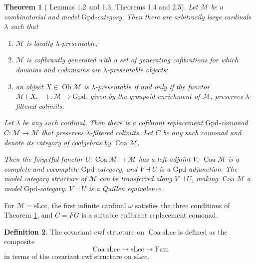 \documentclass[a4paper]{article}
\newtheorem{theorem}{Theorem}
\theoremstyle{remark}
\theoremstyle{definition}
\newtheorem{definition}[theorem]{Definition}
\begin{document}
\begin{theorem}[\citet{coalgebraic-models} Lemmas 1.2 and 1.3, Theorems 1.4 and 2.5]
  \label{th:coalgebraic-model-category}
  Let $\mathcal{M}$ be a combinatorial and model $\mathrm{Gpd}$-category.
  Then there are arbitrarily large cardinals $\lambda$ such that
  \begin{enumerate}[label={(\arabic*)}]
    \item
      $\mathcal{M}$ is locally $\lambda$-presentable;
    \item
      $\mathcal{M}$ is cofibrantly generated with a set of generating cofibrations for which domains and codomains are $\lambda$-presentable objects;
    \item
      an object $X \in \operatorname{Ob} \mathcal{M}$ is $\lambda$-presentable if and only if the functor $\mathcal{M}(X, -) : \mathcal{M} \rightarrow \mathrm{Gpd}$, given by the groupoid enrichment of $\mathcal{M}$, preserves $\lambda$-filtered colimits.
  \end{enumerate}

  Let $\lambda$ be any such cardinal.
  Then there is a cofibrant replacement $\mathrm{Gpd}$-comonad $C : \mathcal{M} \rightarrow \mathcal{M}$ that preserves $\lambda$-filtered colimits. 
  Let $C$ be any such comonad and denote its category of coalgebras by $\operatorname{Coa} \mathcal{M}$.

  Then the forgetful functor $U : \operatorname{Coa} \mathcal{M} \rightarrow \mathcal{M}$ has a left adjoint $V$.
  $\operatorname{Coa} \mathcal{M}$ is a complete and cocomplete $\mathrm{Gpd}$-category, and $V \dashv U$ is a $\mathrm{Gpd}$-adjunction.
  The model category structure of $\mathcal{M}$ can be transferred along $V \dashv U$, making $\operatorname{Coa} \mathcal{M}$ a model $\mathrm{Gpd}$-category.
  $V \dashv U$ is a Quillen equivalence.
\end{theorem}

For $\mathcal{M} = \mathrm{sLcc}$, the first infinite cardinal $\omega$ satisfies the three conditions of Theorem \ref{th:coalgebraic-model-category}, and $C = FG$ is a suitable cofibrant replacement comonad.

\begin{definition}
  The covariant cwf structure on $\operatorname{Coa} \mathrm{sLcc}$ is defined as the composite
  \begin{equation}
    \operatorname{Coa} \mathrm{sLcc} \rightarrow \mathrm{sLcc} \rightarrow \mathrm{Fam}
  \end{equation}
  in terms of the covariant cwf structure on $\mathrm{sLcc}$.
\end{definition}
\end{document}

